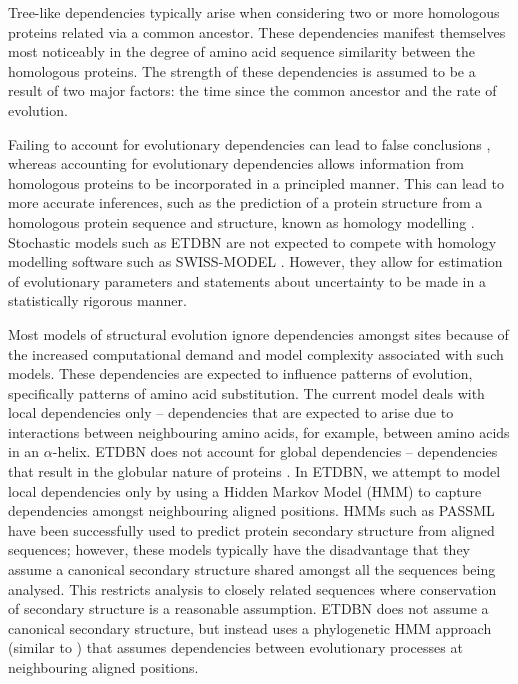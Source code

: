 \documentclass[nogrid]{MBE}%
\begin{document}
Tree-like dependencies typically arise when considering two or more homologous proteins related via a common ancestor. These dependencies manifest themselves most noticeably in the degree of amino acid sequence similarity between the homologous proteins. The strength of these dependencies is assumed to be a result of two major factors: the time since the common ancestor and the rate of evolution.

Failing to account for evolutionary dependencies can lead to false conclusions \citep{felsenstein1985phylogenies}, whereas accounting for evolutionary dependencies allows information from homologous proteins to be incorporated in a principled manner. This can lead to more accurate inferences, such as the prediction of a protein structure from a homologous protein sequence and structure, known as homology modelling \citep{arnold2006swiss}. Stochastic models such as ETDBN are not expected to compete with homology modelling software such as SWISS-MODEL \citep{arnold2006swiss}. However, they allow for estimation of evolutionary parameters and statements about uncertainty to be made in a statistically rigorous manner.

Most models of structural evolution ignore dependencies amongst sites because of the increased computational demand and model complexity associated with such models. These dependencies are expected to influence patterns of evolution, specifically patterns of amino acid substitution. The current model deals with local dependencies only -- dependencies that are expected to arise due to interactions between neighbouring amino acids, for example, between amino acids in an $\alpha$-helix. ETDBN does not account for global dependencies -- dependencies that result in the globular nature of proteins \citep{boomsma2008generative}. In ETDBN, we attempt to model local dependencies only by using a Hidden Markov Model (HMM) to capture dependencies amongst neighbouring aligned positions. HMMs such as PASSML \citep{li1998passml} have been successfully used to predict protein secondary structure from aligned sequences; however, these models typically have the disadvantage that they assume a canonical secondary structure shared amongst all the sequences being analysed. This restricts analysis to closely related sequences where conservation of secondary structure is a reasonable assumption. ETDBN does not assume a canonical secondary structure, but instead uses a phylogenetic HMM approach (similar to \citet{siepel2004combining}) that assumes dependencies between evolutionary processes at neighbouring aligned positions.
\end{document}
